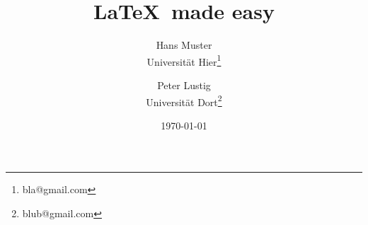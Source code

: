 \documentclass[10pt, a4paper]{article}
\begin{document}
\title{\LaTeX\ made easy}

\author{Hans Muster\\Universität Hier\thanks{bla@gmail.com} \and Peter Lustig\\Universität Dort\thanks{blub@gmail.com}}

\date{\today}

\maketitle


\newpage

\blindtext
\end{document}

